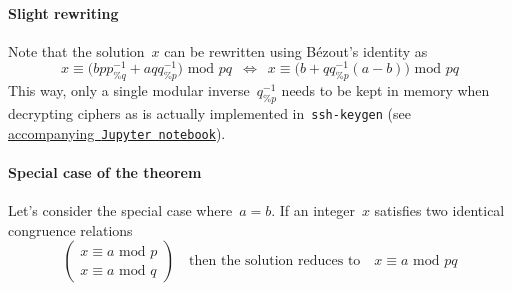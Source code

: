 \documentclass{article}
\begin{document}
\paragraph{Slight rewriting} Note that the solution~$x$ can be rewritten using B\'ezout's identity as
\begin{equation*}
x \equiv \big( b p p^{-1}_{\%q} + a q q^{-1}_{\%p} \big) \,\,\text{mod}\,\, pq \,\,\, \Longleftrightarrow \,\,\, x\equiv \big( b + q q^{-1}_{\%p} (a - b) \big) \,\,\text{mod}\,\, pq
\end{equation*}
This way, only a single modular inverse~$q^{-1}_{\%p}$ needs to be kept in memory when decrypting ciphers as is actually implemented in~\texttt{ssh-keygen} (see \href{https://github.com/Ranlot/public-key-encryption}{accompanying~\texttt{Jupyter notebook}}).

\paragraph{Special case of the theorem}  Let's consider the special case where~$a = b$.  If an integer~$x$ satisfies two identical congruence relations
\begin{equation*}
\begin{pmatrix}
x \equiv a \,\,\text{mod}\,\,p \\
x \equiv a \,\,\text{mod}\,\,q
\end{pmatrix} \quad \text{then the solution reduces to} \quad x \equiv a \,\,\text{mod}\,\, pq    
\end{equation*}
\end{document}
